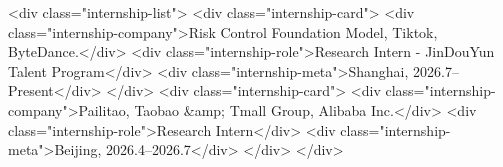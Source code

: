<div class="internship-list">
    <div class="internship-card">
        <div class="internship-company">Risk Control Foundation Model, Tiktok, ByteDance.</div>
        <div class="internship-role">Research Intern - JinDouYun Talent Program</div>
        <div class="internship-meta">Shanghai, 2026.7–Present</div>
    </div>
    <div class="internship-card">
        <div class="internship-company">Pailitao, Taobao &amp; Tmall Group, Alibaba Inc.</div>
        <div class="internship-role">Research Intern</div>
        <div class="internship-meta">Beijing, 2026.4–2026.7</div>
    </div>
</div>

